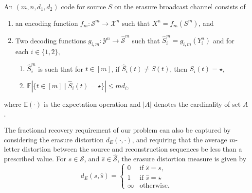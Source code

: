 \begin{mydef}
\label{def:code}
	An $(m, n, d_{1}, d_{2})$ code for source $S$ on the erasure broadcast channel consists of
	
	\begin{enumerate}
		\item an encoding function $f_{m} : \mathcal{S}^{m} \to \mathcal{X}^{n}$ such that $X^{n} = f_{m}(S^{m})$, and
		
		\item Two decoding functions $g_{i,m} : \mathcal{Y}^{n} \to \mathcal{\hat{S}}^{m}$ such that $\hat{S}_{i}^{m} = g_{i,m}(Y_{i}^{n})$ and for each $i \in \{1, 2\}$,
		\begin{enumerate}
			\item $\hat{S}_{i}^{m}$ is such that for $t \in [m]$, if $\hat{S}_{i}(t) \neq S(t)$, then $\hat{S}_{i}(t) = \star$,
			\item $\mathbb{E}   \left\vert{\{t \in [m] \mid \hat{S}_{i}(t) = \star\}}\right\vert \leq m d_{i}$,
		\end{enumerate}
		 	
	\end{enumerate}
	
	where $\mathbb{E}(\cdot)$ is the expectation operation and $\vert A \vert$ denotes the cardinality of set $A$.
\end{mydef}

\begin{remark}
	The fractional recovery requirement of our problem can also be captured by considering the erasure distortion $d_{E}(\cdot, \cdot)$, and requiring that the average $m$-letter distortion between the source and reconstruction sequences be less than a prescribed value.   For $s \in \mathcal{S}$, and $\hat{s} \in \mathcal{\hat{S}}$, the erasure distortion measure is given by
\begin{equation}
\label{eq:symbol_distortion1}
	d_{E}(s, \hat{s}) =
	\begin{cases}
		0 & \text{if } \hat{s} = s, \\
		1 & \text{if } \hat{s} = \star \\
		\infty & \text{otherwise}.
	\end{cases}
\end{equation}

\end{remark}

